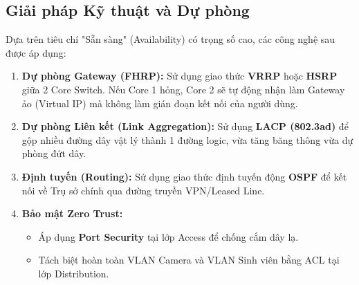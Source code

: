 \subsection{Giải pháp Kỹ thuật và Dự phòng}
Dựa trên tiêu chí "Sẵn sàng" (Availability) có trọng số cao, các công nghệ sau được áp dụng:

\begin{enumerate}
    \item \textbf{Dự phòng Gateway (FHRP):} Sử dụng giao thức \textbf{VRRP} hoặc \textbf{HSRP} giữa 2 Core Switch. Nếu Core 1 hỏng, Core 2 sẽ tự động nhận làm Gateway ảo (Virtual IP) mà không làm gián đoạn kết nối của người dùng.
    \item \textbf{Dự phòng Liên kết (Link Aggregation):} Sử dụng \textbf{LACP (802.3ad)} để gộp nhiều đường dây vật lý thành 1 đường logic, vừa tăng băng thông vừa dự phòng đứt dây.
    \item \textbf{Định tuyến (Routing):} Sử dụng giao thức định tuyến động \textbf{OSPF} để kết nối về Trụ sở chính qua đường truyền VPN/Leased Line.
    \item \textbf{Bảo mật Zero Trust:} 
    \begin{itemize}
        \item Áp dụng \textbf{Port Security} tại lớp Access để chống cắm dây lạ.
        \item Tách biệt hoàn toàn VLAN Camera và VLAN Sinh viên bằng ACL tại lớp Distribution.
    \end{itemize}
\end{enumerate}